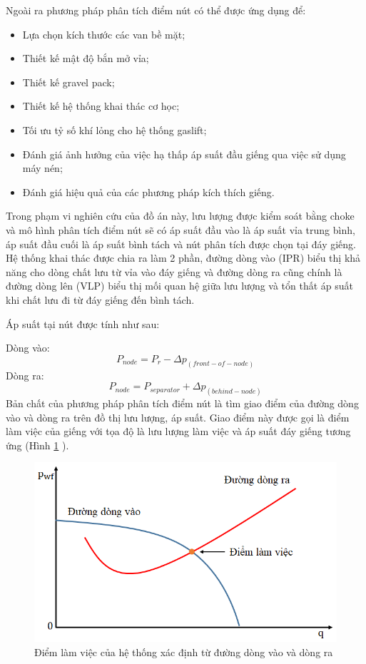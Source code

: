 \documentclass[12pt,a4paper]{report}
\begin{document}
Ngoài ra phương pháp phân tích điểm nút có thể được ứng dụng để:
	\begin{itemize}
		\item Lựa chọn kích thước các van bề mặt;
		\item Thiết kế mật độ bắn mở vỉa;
		\item Thiết kế gravel pack;
		\item Thiết kế hệ thống khai thác cơ học;
		\item Tối ưu tỷ số khí lỏng cho hệ thống gaslift;
		\item Đánh giá ảnh hưởng của việc hạ thấp áp suất đầu giếng qua việc sử dụng máy nén;
		\item Đánh giá hiệu quả của các phương pháp kích thích giếng.
	\end{itemize}
Trong phạm vi nghiên cứu của đồ án này, lưu lượng được kiểm soát bằng choke và mô hình phân tích điểm nút sẽ có áp suất đầu vào là áp suất vỉa trung bình, áp suất đầu cuối là áp suất bình tách và nút phân tích được chọn tại đáy giếng. Hệ thống khai thác được chia ra làm 2 phần, đường dòng vào (IPR)  biểu thị khả năng cho dòng chất lưu từ vỉa vào đáy giếng và đường dòng ra cũng chính là đường dòng lên (VLP)  biểu thị mối quan hệ giữa lưu lượng và tổn thất áp suất khi chất lưu đi từ đáy giếng đến bình tách.

Áp suất tại nút được tính như sau:

Dòng vào:
	\begin{equation}
		P_{node} = P_r - \Delta p_{(front-of-node)}
	\end{equation}
Dòng ra:
	\begin{equation}
		P_{node} = P_{separator} + \Delta p_{(behind-node)}
	\end{equation}
Bản chất của phương pháp phân tích điểm nút là tìm giao điểm của đường dòng vào và dòng ra trên đồ thị lưu lượng, áp suất. Giao điểm này được gọi là điểm làm việc của giếng với tọa độ là lưu lượng làm việc và áp suất đáy giếng tương ứng (Hình \ref{fig:operation_point} \cite{dale1991production}).
	\begin{figure}[h]
		\centering
		\includegraphics[scale=0.8]{fig/operation_point.png}
		\caption{Điểm làm việc của hệ thống xác định từ đường dòng vào và dòng ra}
		\label{fig:operation_point}
	\end{figure}
\end{document}
